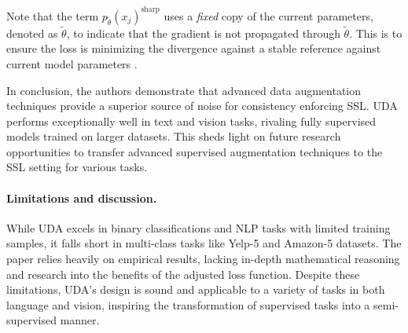 \documentclass{article}
\begin{document}
Note that the term $p_{\tilde{{\theta}}}(x_j)^{\text{sharp}}$ uses a \textit{fixed} copy of the current parameters, 
denoted as $\tilde{\theta}$, to indicate that the gradient is not propagated through $\tilde{\theta}$.
This is to ensure the loss is minimizing the divergence against a stable reference against
current model parameters \cite{miyato2018virtual}.

In conclusion, the authors demonstrate that advanced data augmentation techniques 
provide a superior source of noise for consistency enforcing SSL. UDA performs 
exceptionally well in text and vision tasks, rivaling fully supervised models trained 
on larger datasets. This sheds light on future research opportunities to transfer 
advanced supervised augmentation techniques to the SSL setting for various tasks.

\paragraph{Limitations and discussion.}
While UDA excels in binary classifications and NLP tasks with limited training samples, 
it falls short in multi-class tasks like Yelp-5 and Amazon-5 datasets. The paper 
relies heavily on empirical results, lacking in-depth mathematical reasoning and 
research into the benefits of the adjusted loss function.
Despite these limitations, UDA's design is 
sound and applicable to a variety of tasks in both language and vision, inspiring the 
transformation of supervised tasks into a semi-supervised manner.
\end{document}
